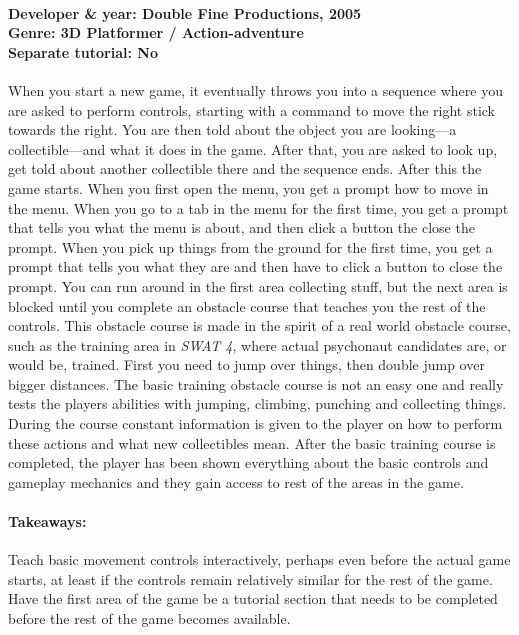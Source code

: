 \paragraph{Developer \& year: Double Fine Productions, 2005 \\ Genre: 3D Platformer / Action-adventure \\ Separate tutorial: No \\}
When you start a new game, it eventually throws you into a sequence where you are asked to perform controls, starting with a command to move the right stick towards the right. You are then told about the object you are looking---a collectible---and what it does in the game. After that, you are asked to look up, get told about another collectible there and the sequence ends. After this the game starts.
When you first open the menu, you get a prompt how to move in the menu.
When you go to a tab in the menu for the first time, you get a prompt that tells you what the menu is about, and then click a button the close the prompt.
When you pick up things from the ground for the first time, you get a prompt that tells you what they are and then have to click a button to close the prompt.
You can run around in the first area collecting stuff, but the next area is blocked until you complete an obstacle course that teaches you the rest of the controls. This obstacle course is made in the spirit of a real world obstacle course, such as the training area in \textit{SWAT 4}, where actual psychonaut candidates are, or would be, trained. First you need to jump over things, then double jump over bigger distances.
The basic training obstacle course is not an easy one and really tests the players abilities with jumping, climbing, punching and collecting things. During the course constant information is given to the player on how to perform these actions and what new collectibles mean.
After the basic training course is completed, the player has been shown everything about the basic controls and gameplay mechanics and they gain access to rest of the areas in the game.
\paragraph{Takeaways:}
Teach basic movement controls interactively, perhaps even before the actual game starts, at least if the controls remain relatively similar for the rest of the game.
Have the first area of the game be a tutorial section that needs to be completed before the rest of the game becomes available.

